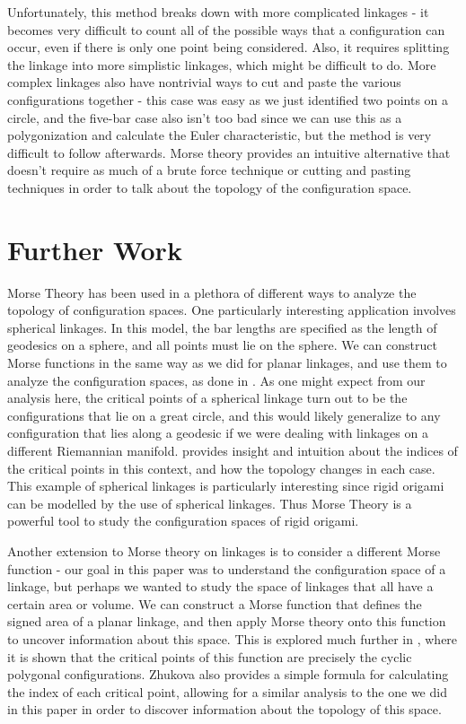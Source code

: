 \documentclass{article}
\begin{document}
Unfortunately, this method breaks down with more complicated linkages - it becomes very difficult to count all of the possible ways that a configuration can occur, even if there is only one point being considered. Also, it requires splitting the linkage into more simplistic linkages, which might be difficult to do. More complex linkages also have nontrivial ways to cut and paste the various configurations together - this case was easy as we just identified two points on a circle, and the five-bar case also isn't too bad since we can use this as a polygonization and calculate the Euler characteristic, but the method is very difficult to follow afterwards. Morse theory provides an intuitive alternative that doesn't require as much of a brute force technique or cutting and pasting techniques in order to talk about the topology of the configuration space. 

\section{Further Work}
Morse Theory has been used in a plethora of different ways to analyze the topology of configuration spaces. One particularly interesting application involves spherical linkages. In this model, the bar lengths are specified as the length of geodesics on a sphere, and all points must lie on the sphere. We can construct Morse functions in the same way as we did for planar linkages, and use them to analyze the configuration spaces, as done in \cite{spherical}. As one might expect from our analysis here, the critical points of a spherical linkage turn out to be the configurations that lie on a great circle, and this would likely generalize to any configuration that lies along a geodesic if we were dealing with linkages on a different Riemannian manifold. \cite{spherical} provides insight and intuition about the indices of the critical points in this context, and how the topology changes in each case. This example of spherical linkages is particularly interesting since rigid origami can be modelled by the use of spherical linkages. Thus Morse Theory is a powerful tool to study the configuration spaces of rigid origami. 

Another extension to Morse theory on linkages is to consider a different Morse function - our goal in this paper was to understand the configuration space of a linkage, but perhaps we wanted to study the space of linkages that all have a certain area or volume. We can construct a Morse function that defines the signed area of a planar linkage, and then apply Morse theory onto this function to uncover information about this space. This is explored much further in \cite{zhukova}, where it is shown that the critical points of this function are precisely the cyclic polygonal configurations. Zhukova also provides a simple formula for calculating the index of each critical point, allowing for a similar analysis to the one we did in this paper in order to discover information about the topology of this space.  
\end{document}

